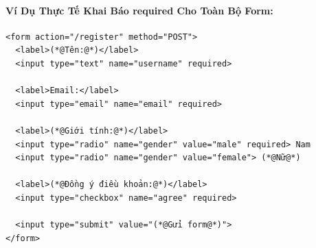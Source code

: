 \documentclass[11pt,oneside]{book}
\begin{document}
\paragraph{Ví Dụ Thực Tế Khai Báo required Cho Toàn Bộ Form:}

\begin{codeWindow}
\begin{lstlisting}[language=HTML5]
<form action="/register" method="POST">
  <label>(*@Tên:@*)</label>
  <input type="text" name="username" required>

  <label>Email:</label>
  <input type="email" name="email" required>

  <label>(*@Giới tính:@*)</label>
  <input type="radio" name="gender" value="male" required> Nam
  <input type="radio" name="gender" value="female"> (*@Nữ@*)

  <label>(*@Đồng ý điều khoản:@*)</label>
  <input type="checkbox" name="agree" required>

  <input type="submit" value="(*@Gửi form@*)">
</form>
\end{lstlisting}
\end{codeWindow}
\end{document}
